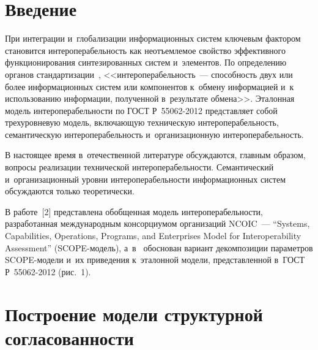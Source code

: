       
  



\thispagestyle{headings}

\begin{multicols}{2}

\label{st\stat}

\section{Введение}
     
     При интеграции и~глобализации информационных сис\-тем ключевым 
фактором становится ин\-тер\-опе\-ра\-бель\-ность как неотъемлемое свойство 
эффективного функционирования синтезированных \mbox{сис\-тем} и~элементов. По 
определению органов стандартизации~\cite{1-dul},  
<<ин\-тер\-опе\-ра\-бел\-ьность~--- спо\-соб\-ность двух или более информационных 
сис\-тем или компонентов к~обмену информацией и~к использованию 
информации, полученной в~результате обмена>>. Эталонная модель 
ин\-тер\-опе\-ра\-бель\-ности по ГОСТ Р~55062-2012 представляет собой 
трехуровневую модель, вклю\-ча\-ющую техническую ин\-тер\-опе\-ра\-бель\-ность, 
семантическую ин\-тер\-опе\-ра\-бель\-ность и~организационную 
ин\-тер\-опе\-ра\-бель\-ность.
     
     В настоящее время в~отечественной литературе обсуж\-да\-ют\-ся, главным 
образом, вопросы реализации технической ин\-тер\-опе\-ра\-бель\-ности. 
Семантический и~организационный уровни ин\-тер\-опе\-ра\-бель\-ности 
информационных сис\-тем обсуждаются только тео\-ре\-ти\-чески. 
     
     В работе~[2] представлена обобщенная модель ин\-тер\-опе\-ра\-бель\-ности, 
разработанная международным консорциумом организаций NCOIC~--- 
``Systems, Capabilities, Operations, Programs, and Enterprises Model for 
Interoperability Assessment'' (SCOPE-мо\-дель), а~в~\cite{3-dul} обоснован 
вариант декомпозиции па\-ра\-мет\-ров SCOPE-мо\-де\-ли и~их приведения 
к~эталонной модели, пред\-став\-лен\-ной в~ГОСТ Р~55062-2012 (рис.~1).



\vspace*{-6pt}

\section{Построение модели структурной согласованности}
     

\end{multicols}
